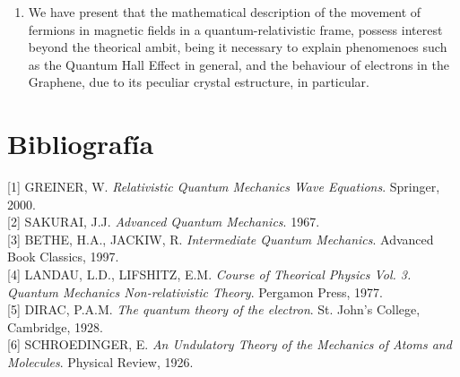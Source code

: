 \documentclass[11pt,letterpaper]{article}     %
\begin{document}
\begin{changemargin}{0.75cm}{0cm}
\begin{enumerate}
\item We have present that the mathematical description of the movement of fermions in magnetic fields in a quantum-relativistic frame, possess interest beyond the theorical ambit, being it necessary to explain phenomenoes such as the Quantum Hall Effect in general, and the behaviour of electrons in the Graphene, due to its peculiar crystal estructure, in particular.
\end{enumerate}
\end{changemargin}
\newpage



\leavevmode\thispagestyle{empty}\newpage



\section{Bibliografía}




[1] GREINER, W. \emph{Relativistic Quantum Mechanics Wave Equations}. Springer, 2000. \\

[2] SAKURAI, J.J.  \emph{Advanced Quantum Mechanics}. 1967. \\

[3] BETHE, H.A., JACKIW, R. \emph{Intermediate Quantum Mechanics}. Advanced Book Classics, 1997.\\

[4] LANDAU, L.D., LIFSHITZ, E.M. \emph{Course of Theorical Physics Vol. 3. Quantum Mechanics Non-relativistic Theory}. Pergamon Press, 1977. \\

[5] DIRAC, P.A.M. \emph{The quantum theory of the electron}. St. John's College, Cambridge, 1928. \\

[6] SCHROEDINGER, E. \emph{An Undulatory Theory of the Mechanics of Atoms and Molecules}. Physical Review, 1926. \\
\end{document}
